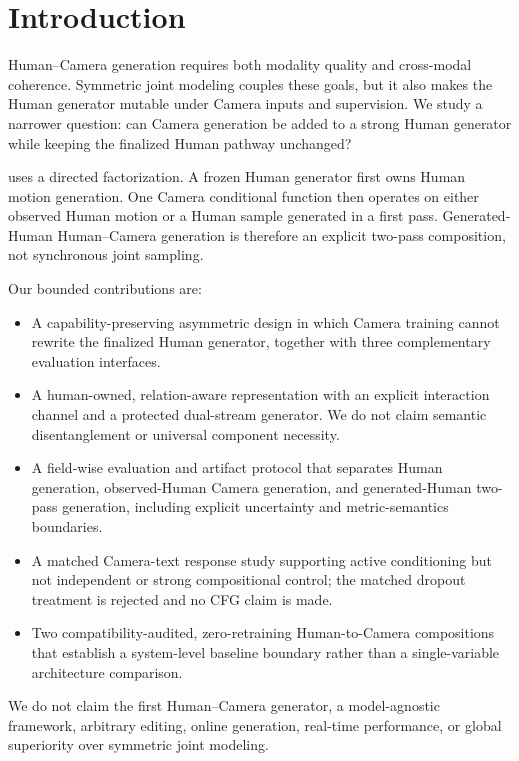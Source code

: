 \section{Introduction}

Human--Camera generation requires both modality quality and cross-modal coherence. Symmetric
joint modeling couples these goals, but it also makes the Human generator mutable under Camera
inputs and supervision. We study a narrower question: can Camera generation be added to a
strong Human generator while keeping the finalized Human pathway unchanged?

\storymotion{} uses a directed factorization. A frozen Human generator first owns Human motion
generation. One Camera conditional function then operates on either observed Human motion or a
Human sample generated in a first pass. Generated-Human Human--Camera generation is therefore
an explicit two-pass composition, not synchronous joint sampling.

Our bounded contributions are:
\begin{itemize}
  \item A capability-preserving asymmetric design in which Camera training cannot rewrite the
  finalized Human generator, together with three complementary evaluation interfaces.
  \item A human-owned, relation-aware representation with an explicit interaction channel and a
  protected dual-stream generator. We do not claim semantic disentanglement or universal
  component necessity.
  \item A field-wise evaluation and artifact protocol that separates Human generation,
  observed-Human Camera generation, and generated-Human two-pass generation, including explicit
  uncertainty and metric-semantics boundaries.
  \item A matched Camera-text response study supporting active conditioning but not independent
  or strong compositional control; the matched dropout treatment is rejected and no CFG claim
  is made.
  \item Two compatibility-audited, zero-retraining Human-to-Camera compositions that establish
  a system-level baseline boundary rather than a single-variable architecture comparison.
\end{itemize}

We do not claim the first Human--Camera generator, a model-agnostic framework, arbitrary
editing, online generation, real-time performance, or global superiority over symmetric joint
modeling.
